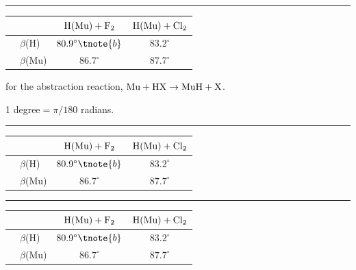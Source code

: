 \hrule

\begin{center}
\begin{threeparttable}
\begin{tabular}{rlcc}
\hline
&   & $\fam0 H(Mu)+F_2$ & $\fam0 H(Mu)+Cl_2$ \\
\hline
&$\beta$(H)  & $80.9^\circ\tnote{b}$ & $83.2^\circ$ \\
&$\beta$(Mu) & $86.7^\circ$ & $87.7^\circ$ \\
\hline
\end{tabular}
\begin{tablenotes}
\item[a] for the abstraction reaction, $\fam0 Mu+HX \rightarrow MuH+X$.
\item[b] 1 degree${} = \pi/180$ radians.
\end{tablenotes}
\caption{The Skewing Angles ($\beta$) for $\fam0 Mu(H)+X_2$ and
   $\fam0 Mu(H)+HX$~}
   \label{threeparttable.2}
\end{threeparttable}
\end{center}

\hrule

\begin{center}
\begin{measuredfigure}
\begin{tabular}{rlcc}
\hline
&   & $\fam0 H(Mu)+F_2$ & $\fam0 H(Mu)+Cl_2$ \\
\hline
&$\beta$(H)  & $80.9^\circ\tnote{b}$ & $83.2^\circ$ \\
&$\beta$(Mu) & $86.7^\circ$ & $87.7^\circ$ \\
\hline
\end{tabular}
\caption{The Skewing Angles ($\beta$) for $\fam0 Mu(H)+X_2$ and
   $\fam0 Mu(H)+HX$~}
\end{measuredfigure}
\end{center}

\hrule

\begin{center}
\begin{measuredfigure}
\caption{The Skewing Angles ($\beta$) for $\fam0 Mu(H)+X_2$ and
   $\fam0 Mu(H)+HX$~}
\begin{tabular}{rlcc}
\hline
&   & $\fam0 H(Mu)+F_2$ & $\fam0 H(Mu)+Cl_2$ \\
\hline
&$\beta$(H)  & $80.9^\circ\tnote{b}$ & $83.2^\circ$ \\
&$\beta$(Mu) & $86.7^\circ$ & $87.7^\circ$ \\
\hline
\end{tabular}
\end{measuredfigure}
\end{center}


